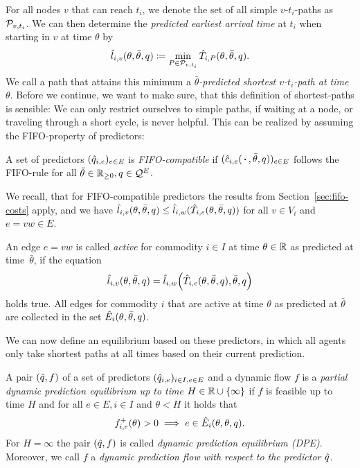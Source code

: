 For all nodes $v$ that can reach $t_i$, we denote the set of all simple $v$-$t_i$-paths as $\mathcal{P}_{v,t_i}$.
We can then determine the \emph{predicted earliest arrival time} at $t_i$ when starting in $v$ at time $\theta$ by
\[
    \hat l_{i,v}(\theta, \bar\theta, q) \coloneqq \min_{P \in \mathcal{P}_{v,t_i}} \hat T_{i, P}(\theta,\bar\theta, q).
\]
We call a path that attains this minimum a \emph{$\bar\theta$-predicted shortest $v$-$t_i$-path at time $\theta$}.
Before we continue, we want to make sure, that this definition of shortest-paths is sensible:
We can only restrict ourselves to simple paths, if waiting at a node, or traveling through a short cycle, is never helpful.
This can be realized by assuming the FIFO-property of predictors:
\begin{definition}
    A set of predictors $(\hat q_{i,e})_{e\in E}$ is \emph{FIFO-compatible} if $(\hat c_{i,e}(\,\boldsymbol{\cdot}\,, \bar\theta, q))_{e\in E}$ follows the FIFO-rule for all $\bar\theta\in\mathbb{R}_{\geq0}, q\in\mathcal{Q}^E$.
\end{definition}

We recall, that for FIFO-compatible predictors the results from Section~\ref{sec:fifo-costs} apply, and we have $\hat l_{i,v}(\theta, \bar\theta, q) \leq \hat l_{i,w}{(
    \hat T_{i, e}(\theta, \bar\theta, q)
)}$
for all $v\in V_i$ and $e=vw\in E$.

\begin{definition}
An edge $e=vw$ is called \emph{active} for commodity $i\in I$ at time $\theta\in\mathbb{R}$ as predicted at time~$\bar\theta$, if the equation \[
    \hat l_{i,v}(\theta, \bar\theta, q) = \hat l_{i,w}{\left(
        \hat T_{i, e}(\theta, \bar\theta, q), \bar\theta, q
    \right)}
\]
holds true.
All edges for commodity $i$ that are active at time $\theta$ as predicted at $\bar\theta$ are collected in the set $\hat E_i(\theta, \bar\theta, q)$. 
\end{definition}

We can now define an equilibrium based on these predictors, in which all agents only take shortest paths at all times based on their current prediction.
\begin{definition}
    A pair $(\hat q, f)$ of a set of predictors $(\hat q_{i,e})_{i\in I, e\in E}$ and a dynamic flow $f$ is a \emph{partial dynamic prediction equilibrium up to time $H\in\mathbb{R}\cup\{\infty\}$} if $f$ is feasible up to time $H$ and for all $e\in E, i\in I$ and $\theta < H$ it holds that
    \[
        {f}^+_{i,e}(\theta) > 0 \implies e \in \hat E_i(\theta, \theta, q).
    \]
    For $H = \infty$ the pair $(\hat q, f)$ is called \emph{dynamic prediction equilibrium (DPE)}. 
    Moreover, we call $f$ a \emph{dynamic prediction flow with respect to the predictor $\hat q$}. 

\end{definition}

